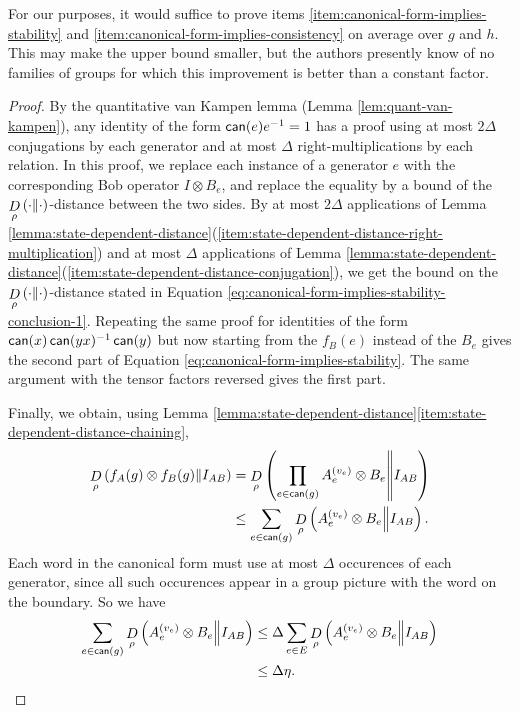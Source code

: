 For our purposes, it would suffice to prove items \eqref{item:canonical-form-implies-stability} and \eqref{item:canonical-form-implies-consistency} on average over $g$ and $h$. This may make the upper bound smaller, but the authors presently know of no families of groups for which this improvement is better than a constant factor. 
\begin{proof}
	By the quantitative van Kampen lemma (Lemma \ref{lem:quant-van-kampen}), any identity of the form $\operatorname*{\mathsf{can}}(e)e^{-1} = 1$ has a proof using at most $2\Delta$ conjugations by each generator and at most $\Delta$ right-multiplications by each relation. In this proof, we replace each instance of a generator $e$ with the corresponding Bob operator $I\otimes B_{e}$, and replace the equality by a bound of the $\mathop{D}\limits_{\rho}\left(\cdot\middle\| \cdot\right)$-distance between the two sides. By at most $2\Delta$ applications of Lemma \ref{lemma:state-dependent-distance}(\ref{item:state-dependent-distance-right-multiplication}) and at most $\Delta$ applications of Lemma \ref{lemma:state-dependent-distance}(\ref{item:state-dependent-distance-conjugation}), we get the bound on the $\mathop{D}\limits_{\rho}\left(\cdot\middle\| \cdot\right)$-distance stated in Equation \eqref{eq:canonical-form-implies-stability-conclusion-1}. Repeating the same proof for identities of the form $\operatorname*{\mathsf{can}}(x)\operatorname*{\mathsf{can}}(yx)^{-1}\operatorname*{\mathsf{can}}(y)$ but now starting from the $f_B(e)$ instead of the $B_e$ gives the second part of Equation \eqref{eq:canonical-form-implies-stability}. The same argument with the tensor factors reversed gives the first part.

	Finally, we obtain, using Lemma \ref{lemma:state-dependent-distance}\eqref{item:state-dependent-distance-chaining},
	\begin{align}
		\mathop{D}\limits_{\rho}\left(f_A(g)\otimes f_B(g)\middle\| I_{AB}\right) 
		&= \mathop{D}\limits_{\rho}\left(\prod_{e\in \operatorname*{\mathsf{can}}(g)}{ A_e^{(v_e)}\otimes B_e}\middle\| I_{AB}\right)
		\\&\leq \sum_{e\in \operatorname*{\mathsf{can}}(g)} 
		\mathop{D}\limits_{\rho}\left(A_e^{(v_e)}\otimes B_e\middle\| I_{AB}\right).
	\end{align}
	Each word in the canonical form must use at most $\Delta$ occurences of each generator, since all such occurences appear in a group picture with the word on the boundary. So we have
	\begin{align}
		\sum_{e\in \operatorname*{\mathsf{can}}(g)} 
		\mathop{D}\limits_{\rho}\left(A_e^{(v_e)}\otimes B_e\middle\| I_{AB}\right)
		&\leq \Delta\sum_{e\in E} 
		\mathop{D}\limits_{\rho}\left(A_e^{(v_e)}\otimes B_e\middle\| I_{AB}\right)
		\\&\leq \Delta \eta.
	\end{align}
\end{proof}

